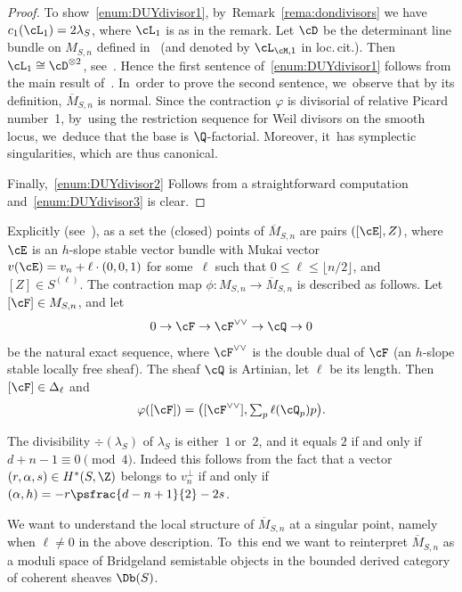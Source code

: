 \begin{proof}
To show~\eqref{enum:DUYdivisor1}, by~Remark~\ref{rema:dondivisors} we have $c_1(\cL_1)=2\lambda_S$, where $\cL_1$ is as in the remark.
Let $\cD$ be the determinant line bundle on $M_{S,n}$ defined in~\cite{Li:uhlencomp} (and denoted by $\cL_{\cM,1}$ in loc.\,cit.).
Then $\cL_1\cong \cD^{\otimes 2}$, see~\cite[Lem.\,8.3.4]{HL:moduli}. Hence the first sentence of~\eqref{enum:DUYdivisor1} follows from the main result of~\cite{Li:uhlencomp}. In~order to prove the second sentence, we~observe that by its definition, $\overline{M}_{S,n}$ is normal.
Since the contraction $\varphi$ is divisorial of relative Picard number~1, by~using the restriction sequence for Weil divisors on the smooth locus, we~deduce that the base is $\Q$-factorial.
Moreover, it~has symplectic singularities, which are thus canonical.

Finally,~\eqref{enum:DUYdivisor2} Follows from a straightforward computation and~\eqref{enum:DUYdivisor3} is clear.
\end{proof}

Explicitly (see~\cite{Li:uhlencomp}), as a set the (closed) points of $\overline{M}_{S,n}$ are pairs $([\cE],Z)$, where~$\cE$ is an $h$-slope stable vector bundle with Mukai vector $v(\cE)=v_n+\ell\cdot(0,0,1)$ for some~$\ell$ such that $0\le \ell\le \lfloor n/2\rfloor$, and $[Z]\in S^{(\ell)}$.
The contraction map $\phi\colon M_{S,n}\to \overline{M}_{S,n}$ is described as follows.
Let $[\cF]\in M_{S,n}$, and let
\[
0\to \cF\to \cF^{\vee\vee}\to \cQ\to 0
\]
be the natural exact sequence, where $\cF^{\vee\vee}$ is the double dual of $\cF$ (an $h$-slope stable locally free sheaf).
The sheaf $\cQ$ is Artinian, let $\ell$ be its length.
Then $[\cF]\in\Delta_{\ell}$ and
\[\textstyle
\varphi([\cF])=\bigl([\cF^{\vee\vee}],\sum_{p}\ell(\cQ_p)p\bigr).
\]

\begin{rema}\label{rmk:divisibility}
The divisibility $\div(\lambda_S)$ of $\lambda_S$ is either~$1$ or~$2$, and it equals $2$ if and only if $d+n-1\equiv 0 \pmod 4$.
Indeed this follows from the fact that a vector $(r,\alpha,s)\in H^*(S,\Z)$ belongs to $v_n^\perp$ if and only if $(\alpha,h)=-r\psfrac{d-n+1}{2}-2s$.
\end{rema}

We want to understand the local structure of $\overline{M}_{S,n}$ at a singular point, namely when $\ell\neq0$ in the above description. To~this end we want to reinterpret $\overline{M}_{S,n}$ as a moduli space of Bridgeland semistable objects in the bounded derived category of coherent sheaves $\Db(S)$.

